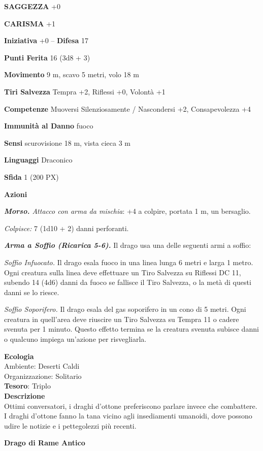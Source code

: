 \begin{multicols}{2}
\textbf{SAGGEZZA} +0

\textbf{CARISMA} +1

\textbf{Iniziativa} +0 -- \textbf{Difesa} 17

\textbf{Punti Ferita} 16 (3d8 + 3)

\textbf{Movimento} 9 m, scavo 5 metri, volo 18 m

\textbf{Tiri Salvezza} Tempra +2, Riflessi +0, Volontà +1

\textbf{Competenze} Muoversi Silenziosamente / Nascondersi +2, Consapevolezza +4

\textbf{Immunità al Danno} fuoco

\textbf{Sensi} scurovisione 18 m, vista cieca 3 m

\textbf{Linguaggi} Draconico

\textbf{Sfida} 1 (200 PX)

\textbf{Azioni}

\textit{\textbf{Morso.} Attacco con arma da mischia}: +4 a colpire, portata 1 m, un bersaglio.

\textit{Colpisce:} 7 (1d10 + 2) danni perforanti.

\textit{\textbf{Arma a Soffio (Ricarica 5-6).}} Il drago usa una delle seguenti armi a soffio:

\textit{Soffio Infuocato.} Il drago esala fuoco in una linea lunga 6 metri e larga 1 metro. Ogni creatura sulla linea deve effettuare un Tiro Salvezza su Riflessi DC 11, subendo 14 (4d6) danni da fuoco se fallisce il Tiro Salvezza, o la metà di questi danni se lo riesce.

\textit{Soffio Soporifero.} Il drago esala del gas soporifero in un cono di 5 metri. Ogni creatura in quell'area deve riuscire un Tiro Salvezza su Tempra 11 o cadere svenuta per 1 minuto. Questo effetto termina se la creatura svenuta subisce danni o qualcuno impiega un'azione per risvegliarla.

\textbf{Ecologia}\\
Ambiente: Deserti Caldi\\
Organizzazione: Solitario\\
\textbf{Tesoro}: Triplo\\
\textbf{Descrizione}\\
Ottimi conversatori, i draghi d'ottone preferiscono parlare invece che combattere. I draghi d'ottone fanno la tana vicino agli insediamenti umanoidi, dove possono udire le notizie e i pettegolezzi più recenti.


\medskip{}\textbf{Drago di Rame Antico}


\end{multicols}
